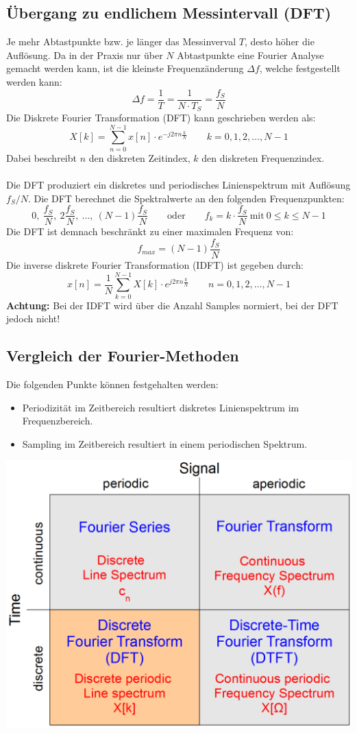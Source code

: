 \subsection{Übergang zu endlichem Messintervall (DFT)}
Je mehr Abtastpunkte bzw. je länger das Messinverval $T$, desto höher die Auflösung. 
Da in der Praxis nur über $N$ Abtastpunkte eine Fourier Analyse gemacht werden kann,
ist die kleinste Frequenzänderung $\Delta f$, welche festgestellt werden kann:
\[ \Delta f = \frac{1}{T} = \frac{1}{N \cdot T_S} = \frac{f_S}{N} \]
Die Diskrete Fourier Transformation (DFT) kann geschrieben werden als:
\[ X[k] = \sum_{n=0}^{N-1}x[n] \cdot e^{-j 2 \pi n \frac{k}{N}} \qquad 
	k = 0,1, 2, \ldots , N-1 \]
Dabei beschreibt $n$ den diskreten Zeitindex, $k$ den diskreten Frequenzindex.\\\\
Die DFT produziert ein diskretes und periodisches Linienspektrum mit Auflösung $f_S/N$. 
Die DFT berechnet die Spektralwerte an den folgenden Frequenzpunkten:
\[ 0,\ \frac{f_S}{N},\ 2\frac{f_S}{N},\ ...,\ (N-1)\frac{f_S}{N} \qquad \mathrm{oder}
 \qquad f_k = k \cdot \frac{f_S}{N} \mathrm{\ mit\ } 0 \leq k \leq N-1\]
Die DFT ist demnach beschränkt zu einer maximalen Frequenz von:
\[ f_{max}=(N-1)\frac{f_S}{N} \]
Die inverse diskrete Fourier Transformation (IDFT) ist gegeben durch:
\[ x[n] = \frac{1}{N} \sum_{k=0}^{N-1} X[k] \cdot e^{j 2\pi n \frac{k}{N}} 
	\qquad n = 0,1, 2, \ldots , N-1 \]
\textbf{Achtung:}
Bei der IDFT wird über die Anzahl Samples normiert, bei der DFT jedoch nicht!
\newpage

\subsection{Vergleich der Fourier-Methoden}
Die folgenden Punkte können festgehalten werden:
\begin{itemize}[noitemsep,topsep=3pt]
	\item Periodizität im Zeitbereich resultiert diskretes Linienspektrum im Frequenzbereich.
	\item Sampling im Zeitbereich resultiert in einem periodischen Spektrum.
\end{itemize}
\begin{center}
	\includegraphics[width=.4\textwidth]{../fig/fft_methods}
\end{center}

